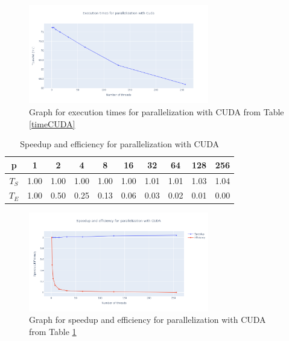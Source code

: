 \documentclass[11pt]{article}
\begin{document}
\begin{figure}[H]
    \centering
    \includegraphics[width=0.7\textwidth]{Plots/time_CUDA.png}
    \caption{Graph for execution times for parallelization with CUDA from Table \ref{timeCUDA}}
    \label{fig:exec_CUDA}
\end{figure}

\begin{table}[H]
\centering
\begin{tabular}{|c|c|c|c|c|c|c|c|c|c|}
\hline
p & 1 & 2 & 4 & 8 & 16 & 32 & 64 & 128 & 256 \\ \hline
$T_S$ & 1.00 & 1.00 & 1.00 & 1.00 & 1.00 & 1.01 & 1.01 & 1.03 & 1.04 \\ \hline
$T_E$ & 1.00 & 0.50 & 0.25 & 0.13 & 0.06 & 0.03 & 0.02 & 0.01 & 0.00 \\ \hline
\end{tabular}
\caption{Speedup and efficiency for parallelization with CUDA} \label{speedupefficiencycuda}
\end{table}


\begin{figure}[H]
    \centering
    \includegraphics[width=0.7\textwidth]{Plots/speedup_cuda.png}
    \caption{Graph for speedup and efficiency for parallelization with CUDA from Table \ref{speedupefficiencycuda}}
    \label{fig:speedup_cuda}
\end{figure}
\end{document}
